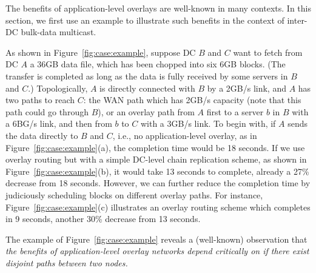 The benefits of application-level overlays are well-known in
many contexts.
In this section, we first use an example  to
illustrate such benefits in the context of inter-DC bulk-data
multicast.

As shown in Figure~\ref{fig:case:example},
suppose DC $B$ and $C$ want to fetch from DC $A$ a 36GB data file,
which has been chopped into six 6GB blocks.
(The transfer is completed as long as the data is fully received
by some servers in $B$ and $C$.)
Topologically, $A$ is directly connected with $B$ by a 2GB/s
link, and $A$ has two paths to reach $C$: the WAN path
which has 2GB/s capacity
(note that this path could go through $B$), or an overlay path
from $A$ first to a server $b$ in $B$ with a 6BG/s link,
and then from $b$ to $C$ with a 3GB/s link.
To begin with, if $A$ sends the data directly to $B$ and $C$,
i.e., no application-level overlay,
as in Figure~\ref{fig:case:example}(a),
the completion time would be 18 seconds.
If we use overlay routing but with a simple DC-level chain
replication scheme, as shown in Figure~\ref{fig:case:example}(b),
it would take 13 seconds
to complete, already a 27\% decrease from 18 seconds.
However, we can further reduce the completion time
by judiciously scheduling blocks on different
overlay paths. For instance, Figure~\ref{fig:case:example}(c)
illustrates an overlay routing scheme which completes in 9
seconds, another 30\% decrease from 13 seconds.

The example of Figure~\ref{fig:case:example}
reveals a (well-known) observation that {\em the benefits of
application-level overlay networks depend critically on if
there exist disjoint paths between two nodes.}


